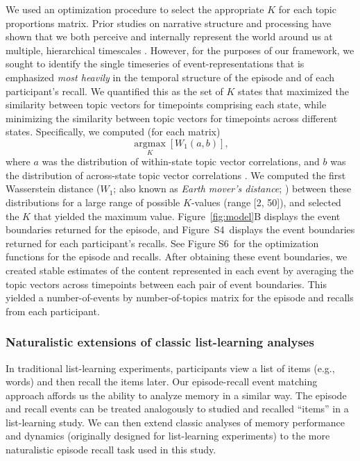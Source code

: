 \documentclass{article}
\newcommand{\argmax}{\mathop{\mathrm{argmax}}\limits}
\newcommand{\corrmats}{S4}
\newcommand{\kopt}{S6}
\begin{document}
We used an optimization procedure to select the appropriate $K$ for each topic proportions matrix.  Prior studies on narrative structure and processing have shown that we both perceive and internally represent the world around us at multiple, hierarchical timescales \citep[e.g.,][]{HassEtal08, LernEtal11, HassEtal15, ChenEtal17, BaldEtal17, BaldEtal18}.  However, for the purposes of our framework, we sought to identify the single timeseries of event-representations that is emphasized \textit{most heavily} in the temporal structure of the episode and of each participant's recall.  We quantified this as the set of $K$ states that maximized the similarity between topic vectors for timepoints comprising each state, while minimizing the similarity between topic vectors for timepoints across different states.  Specifically, we computed (for each matrix)
\[
  \argmax_K \left[W_{1}(a, b)\right],
\]
where $a$ was the distribution of within-state topic vector correlations, and $b$ was the distribution of across-state topic vector correlations .  We computed the first Wasserstein distance ($W_{1}$; also known as \textit{Earth mover's distance}; \citealp{Dobr70, RamdEtal17}) between these distributions for a large range of possible $K$-values (range [2, 50]), and selected the $K$ that yielded the maximum value.  Figure~\ref{fig:model}B displays the event boundaries returned for the episode, and Figure~\corrmats~displays the event boundaries returned for each participant's recalls.  See Figure \kopt~for the optimization functions for the episode and recalls.  After obtaining these event boundaries, we created stable estimates of the content represented in each event by averaging the topic vectors across timepoints between each pair of event boundaries.  This yielded a number-of-events by number-of-topics matrix for the episode and recalls from each participant.

\subsubsection*{Naturalistic extensions of classic list-learning analyses}
In traditional list-learning experiments, participants view a list of items (e.g., words) and then recall the items later.  Our episode-recall event matching approach affords us the ability to analyze memory in a similar way. The episode and recall events can be treated analogously to studied and recalled ``items'' in a list-learning study.  We can then extend classic analyses of memory performance and dynamics (originally designed for list-learning experiments) to the more naturalistic episode recall task used in this study.
\end{document}

